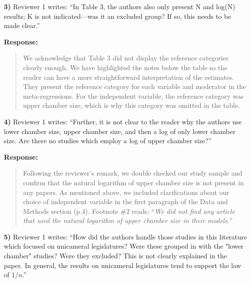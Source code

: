 \documentclass[a4paper,12pt]{article}
\begin{document}
\vspace{.3cm}

\noindent \textbf{3)} Reviewer 1 writes: ``In Table 3, the authors also only present N and log(N) results; K is not indicated—was it an excluded group? If so, this needs to be made clear.''

\vspace{.3cm}

\noindent \textbf{Response:} 
\begin{quote}
    We acknowledge that Table 3 did not display the reference categories clearly enough. We have highlighted the notes below the table so the reader can have a more straightforward interpretation of the estimates. They present the reference category for each variable and moderator in the meta-regressions. For the independent variable, the reference category was upper chamber size, which is why this category was omitted in the table.
\end{quote}

\vspace{.3cm}

\noindent \textbf{4)} Reviewer 1 writes: ``Further, it is not clear to the reader why the authors use lower chamber size, upper chamber size, and then a log of only lower chamber size. Are there no studies which employ a log of upper chamber size?''

\vspace{.3cm}

\noindent \textbf{Response:} 
\begin{quote}
    Following the reviewer's remark, we double checked our study sample and confirm that the natural logarithm of upper chamber size is not present in any papers. As mentioned above, we included clarifications about our choice of independent variable in the first paragraph of the Data and Methods section (p.4). Footnote \#2 reads: ``\textit{We did not find any article that used the natural logarithm of upper chamber size in their models.}''
\end{quote}

\vspace{.3cm}

\noindent \textbf{5)} Reviewer 1 writes: ``How did the authors handle those studies in this literature which focused on unicameral legislatures? Were these grouped in with the "lower chamber" studies? Were they excluded? This is not clearly explained in the paper. In general, the results on unicameral legislatures tend to support the law of $1/n$.''
\end{document}
